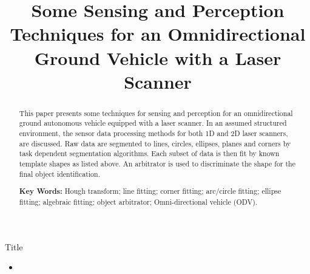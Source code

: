 \documentclass[a4paper,12pt]{article}
\begin{document}
\layout
\bf \Large

\begin{screen}
    \title{\color{section1}\Huge Some Sensing and Perception Techniques for an
Omnidirectional Ground Vehicle with a Laser Scanner}

\author{\color{black}{Zhen Song, YangQuan Chen, Lili Ma and You Chung Chung}}
\maketitle
\begin{abstract}
 This paper presents some techniques for sensing and perception for an
omnidirectional ground autonomous vehicle equipped with a laser scanner. In an
assumed structured environment, the sensor data processing methods for both 1D
and 2D laser scanners, are discussed. Raw data are segmented to lines, circles,
ellipses, planes and corners by task dependent segmentation algorithms.  Each
subset of data is then fit by known template shapes as listed above.  An arbitrator is used to discriminate the shape for the final object identification.

\vspace{1cm}
{\bf Key Words: } 
 Hough transform;
 line fitting;
 corner fitting;
 arc/circle fitting;
 ellipse fitting;
 algebraic fitting;
 object arbitrator;
 Omni-directional vehicle (ODV).
\end{abstract}
\end{screen}

%
%


\begin{slide} %
\centerline{\Huge Title }\vspace{0.5cm}
    \begin{itemize}
    \item 
    \end{itemize}
        
\end{slide}
\end{document}
